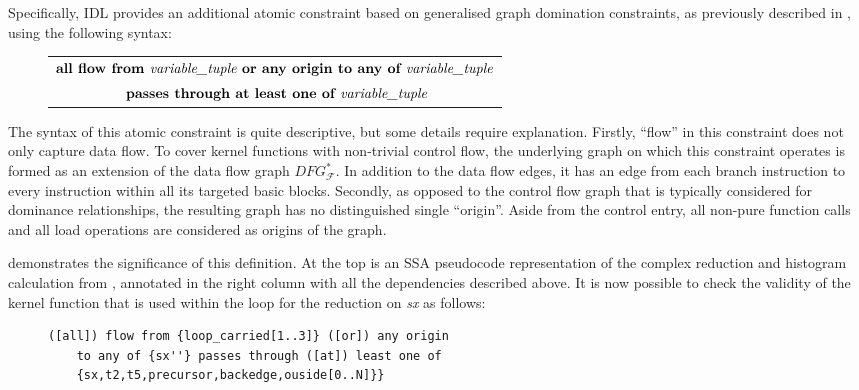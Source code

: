     Specifically, IDL provides an additional atomic constraint based on
    generalised graph domination constraints, as previously described in
    , using the following syntax:
\begin{figure}[h]
    \centering
    \begin{tabular}{|c|}
        \hline
        $\textbf{all flow from }\text{\it variable\_tuple}\textbf{ or any origin to any of }\text{\it variable\_tuple}$\\
        $\textbf{ passes through at least one of }\text{\it variable\_tuple}$\\
        \hline
    \end{tabular}
\end{figure}

    \noindent
    The syntax of this atomic constraint is quite descriptive, but some
    details require explanation.
    Firstly, ``flow'' in this constraint does not only capture data flow.
    To cover kernel functions with non-trivial control flow, the
    underlying graph on which this constraint operates is formed as an extension
    of the data flow graph $DFG_\mathcal F^*$.
    In addition to the data flow edges, it has an edge from each branch
    instruction to every instruction within all its targeted basic blocks.
    Secondly, as opposed to the control flow graph that is typically considered
    for dominance relationships, the resulting graph has no distinguished single
    ``origin''.
    Aside from the control entry, all non-pure function calls and all load
    operations are considered as origins of the graph.

     demonstrates the significance of this definition.
    At the top is an SSA pseudocode representation of the complex reduction and
    histogram calculation from , annotated in the
    right column with all the dependencies described above.
    It is now possible to check the validity of the kernel function that is used
    within the loop for the reduction on \textit{sx} as follows:
    
\begin{figure}[h]
    \centering
    \begin{lstlisting}[language=IDL]
([all]) flow from {loop_carried[1..3]} ([or]) any origin
    to any of {sx''} passes through ([at]) least one of
    {sx,t2,t5,precursor,backedge,ouside[0..N]}}
    \end{lstlisting}
\end{figure}

